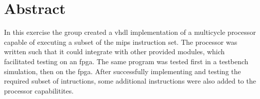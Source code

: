 \chapter*{Abstract}

In this exercise the group created a \gls{vhdl} implementation of a multicycle processor capable of executing a subset of the \gls{mips} instruction set.
The processor was written such that it could integrate with other provided modules,
which facilitated testing on an \gls{fpga}.
The same program was tested first in a testbench simulation,
then on the \gls{fpga}.
After successfully implementing and testing the required subset of intructions,
some additional instructions were also added to the processor capabilitites.

